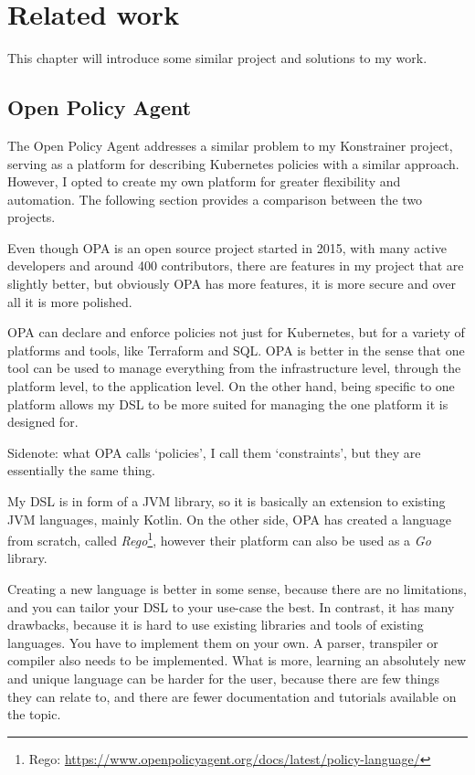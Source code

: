 \setlength{\parindent}{0pt}
\setlength{\parskip}{0.6em}

\chapter{Related work}
\label{chap:relatedWorks}

This chapter will introduce some similar project and solutions to my work.

\section{Open Policy Agent}

The Open Policy Agent addresses a similar problem to my Konstrainer project, serving as a platform for describing Kubernetes policies with a similar approach. However, I opted to create my own platform for greater flexibility and automation. The following section provides a comparison between the two projects.

Even though OPA is an open source project started in 2015, with many active developers and around 400 contributors, there are features in my project that are slightly better, but obviously OPA has more features, it is more secure and over all it is more polished.

OPA can declare and enforce policies not just for Kubernetes, but for a variety of platforms and tools, like Terraform and SQL. OPA is better in the sense that one tool can be used to manage everything from the infrastructure level, through the platform level, to the application level. On the other hand, being specific to one platform allows my DSL to be more suited for managing the one platform it is designed for.

Sidenote: what OPA calls `policies', I call them `constraints', but they are essentially the same thing.

My DSL is in form of a JVM library, so it is basically an extension to existing JVM languages, mainly Kotlin. On the other side, OPA has created a language from scratch, called \emph{Rego}\footnote{Rego: \url{https://www.openpolicyagent.org/docs/latest/policy-language/}}, however their platform can also be used as a \emph{Go} library. 

Creating a new language is better in some sense, because there are no limitations, and you can tailor your DSL to your use-case the best. In contrast, it has many drawbacks, because it is hard to use existing libraries and tools of existing languages. You have to implement them on your own. A parser, transpiler or compiler also needs to be implemented. What is more, learning an absolutely new and unique language can be harder for the user, because there are few things they can relate to, and there are fewer documentation and tutorials available on the topic.


